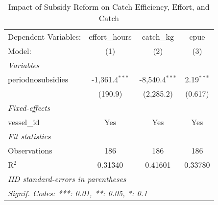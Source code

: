 
\begin{table}[htbp]
   \caption{\label{tab:cpue_regression} Impact of Subsidy Reform on Catch Efficiency, Effort, and Catch}
   \centering
   \begin{tabular}{lccc}
      \tabularnewline \midrule \midrule
      Dependent Variables: & effort\_hours    & catch\_kg        & cpue\\  
      Model:               & (1)              & (2)              & (3)\\  
      \midrule
      \emph{Variables}\\
      periodnosubsidies    & -1,361.4$^{***}$ & -8,540.4$^{***}$ & 2.19$^{***}$\\   
                           & (190.9)          & (2,285.2)        & (0.617)\\   
      \midrule
      \emph{Fixed-effects}\\
      vessel\_id           & Yes              & Yes              & Yes\\  
      \midrule
      \emph{Fit statistics}\\
      Observations         & 186              & 186              & 186\\  
      R$^2$                & 0.31340          & 0.41601          & 0.33780\\  
      \midrule \midrule
      \multicolumn{4}{l}{\emph{IID standard-errors in parentheses}}\\
      \multicolumn{4}{l}{\emph{Signif. Codes: ***: 0.01, **: 0.05, *: 0.1}}\\
   \end{tabular}
\end{table}


